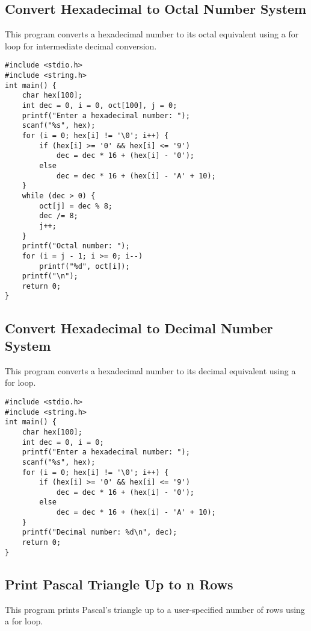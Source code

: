 \documentclass[a4paper,12pt]{article}
\begin{document}
\newpage

\subsection{Convert Hexadecimal to Octal Number System}
This program converts a hexadecimal number to its octal equivalent using a for loop for intermediate decimal conversion.

\begin{lstlisting}[caption={Convert Hexadecimal to Octal Number System}]
#include <stdio.h>
#include <string.h>
int main() {
    char hex[100];
    int dec = 0, i = 0, oct[100], j = 0;
    printf("Enter a hexadecimal number: ");
    scanf("%s", hex);
    for (i = 0; hex[i] != '\0'; i++) {
        if (hex[i] >= '0' && hex[i] <= '9')
            dec = dec * 16 + (hex[i] - '0');
        else
            dec = dec * 16 + (hex[i] - 'A' + 10);
    }
    while (dec > 0) {
        oct[j] = dec % 8;
        dec /= 8;
        j++;
    }
    printf("Octal number: ");
    for (i = j - 1; i >= 0; i--)
        printf("%d", oct[i]);
    printf("\n");
    return 0;
}
\end{lstlisting}

\newpage

\subsection{Convert Hexadecimal to Decimal Number System}
This program converts a hexadecimal number to its decimal equivalent using a for loop.

\begin{lstlisting}[caption={Convert Hexadecimal to Decimal Number System}]
#include <stdio.h>
#include <string.h>
int main() {
    char hex[100];
    int dec = 0, i = 0;
    printf("Enter a hexadecimal number: ");
    scanf("%s", hex);
    for (i = 0; hex[i] != '\0'; i++) {
        if (hex[i] >= '0' && hex[i] <= '9')
            dec = dec * 16 + (hex[i] - '0');
        else
            dec = dec * 16 + (hex[i] - 'A' + 10);
    }
    printf("Decimal number: %d\n", dec);
    return 0;
}
\end{lstlisting}

\newpage

\subsection{Print Pascal Triangle Up to n Rows}
This program prints Pascal's triangle up to a user-specified number of rows using a for loop.
\end{document}
